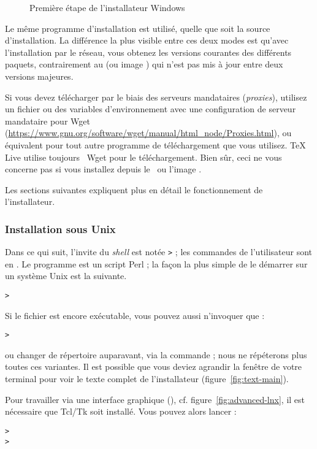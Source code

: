 \documentclass[german, english, french]{article}
\renewcommand{\TL}{\TeX{} Live\xspace}%
\begin{document}
\begin{figure}[tb]
  \centering {}
  \caption{Première étape de l'installateur Windows}\label{fig:nsis}
\end{figure}

Le même programme d'installation est utilisé, quelle que soit la source
d'installation. La différence la plus visible entre ces deux modes est qu'avec
l'installation par le réseau, vous obtenez les versions courantes des différents
paquets, contrairement au \DVD{} (ou image \ISO) qui n'est pas mis à jour entre
deux versions majeures.

Si vous devez télécharger par le biais des serveurs mandataires
(\emph{proxies}), utilisez un fichier  ou des variables
d'environnement avec une configuration de serveur mandataire pour Wget
(\url{https://www.gnu.org/software/wget/manual/html_node/Proxies.html}), ou
équivalent pour tout autre programme de téléchargement que vous utilisez.  \TL{}
utilise toujours \GNU\ Wget pour le téléchargement. Bien sûr, ceci ne vous
concerne pas si vous installez depuis le \DVD\ ou l'image \ISO.

Les sections suivantes expliquent plus en détail le fonctionnement de
l'installateur.

\subsubsection{Installation sous Unix}

Dans ce qui suit, l'invite du \textit{shell} est notée \texttt{>} ; les
commandes de l'utilisateur sont en . Le programme
 est un script Perl ; la façon la plus simple de le
démarrer sur un système Unix est la suivante.
\begin{alltt}
> 
\end{alltt}
Si le fichier  est encore exécutable, vous pouvez aussi
n'invoquer que :
\begin{alltt}
> 
\end{alltt}
ou changer de répertoire auparavant, via la commande  ; nous ne
répéterons plus toutes ces variantes. Il est possible que vous deviez agrandir
la fenêtre de votre terminal pour voir le texte complet de l'installateur
(figure~\ref{fig:text-main}).

Pour travailler via une interface graphique (\GUI{}),
cf. figure~\ref{fig:advanced-lnx}, il est nécessaire que Tcl/Tk soit
installé. Vous pouvez alors lancer :
\begin{alltt}
> 
> 
\end{alltt}
\end{document}
